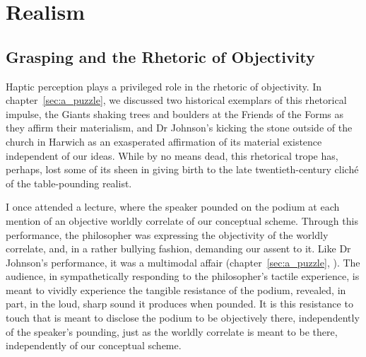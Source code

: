 \chapter{Realism} %
\label{cha:realism}

\section{Grasping and the Rhetoric of Objectivity} %
\label{sec:grasping_and_the_rhetoric_of_objectivity}

Haptic perception plays a privileged role in the rhetoric of objectivity. In chapter~\ref{sec:a_puzzle}, we discussed two historical exemplars of this rhetorical impulse, the Giants shaking trees and boulders at the Friends of the Forms as they affirm their materialism, and Dr Johnson's kicking the stone outside of the church in Harwich as an exasperated affirmation of its material existence independent of our ideas. While by no means dead, this rhetorical trope has, perhaps, lost some of its sheen in giving birth to the late twentieth-century clich\'{e} of the table-pounding realist.

I once attended a lecture, where the speaker pounded on the podium at each mention of an objective worldly correlate of our conceptual scheme. Through this performance, the philosopher was expressing the objectivity of the worldly correlate, and, in a rather bullying fashion, demanding our assent to it. Like Dr Johnson's performance, it was a multimodal affair (chapter~\ref{sec:a_puzzle}, \citealt[71]{Campbell:2014aa}). The audience, in sympathetically responding to the philosopher's tactile experience, is meant to vividly experience the tangible resistance of the podium, revealed, in part, in the loud, sharp sound it produces when pounded. It is this resistance to touch that is meant to disclose the podium to be objectively there, independently of the speaker's pounding, just as the worldly correlate is meant to be there, independently of our conceptual scheme.

